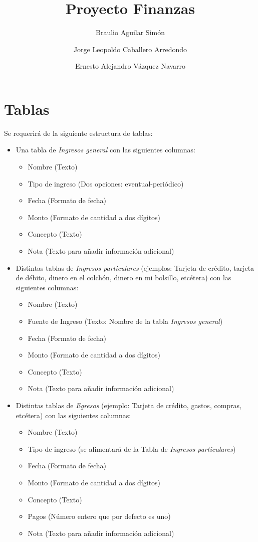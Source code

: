\documentclass[12pt]{article}
\title{Proyecto \textbf{Finanzas}}
\author{Braulio Aguilar Simón \and Jorge Leopoldo Caballero Arredondo \and Ernesto Alejandro Vázquez Navarro}
\theoremstyle{definition}
\begin{document}
\maketitle


\section{Tablas}

Se requerirá de la siguiente estructura de tablas:
\begin{itemize}
\item Una tabla de \textit{Ingresos general} con las siguientes columnas:
\begin{itemize}
\item Nombre (Texto)
\item Tipo de ingreso (Dos opciones: eventual-periódico)
\item Fecha (Formato de fecha)
\item Monto (Formato de cantidad a dos dígitos)
\item Concepto (Texto)
\item Nota (Texto para añadir información adicional)
\end{itemize}

\item Distintas tablas de \textit{Ingresos particulares} (ejemplos: Tarjeta de crédito, tarjeta de débito, dinero en el colchón, dinero en mi bolsillo, etcétera) con las siguientes columnas:
\begin{itemize}
\item Nombre (Texto)
\item Fuente de Ingreso (Texto: Nombre de la tabla \textit{Ingresos general})
\item Fecha (Formato de fecha)
\item Monto (Formato de cantidad a dos dígitos)
\item Concepto (Texto)
\item Nota (Texto para añadir información adicional)
\end{itemize}

\item Distintas tablas de \textit{Egresos} (ejemplo: Tarjeta de crédito, gastos, compras, etcétera) con las siguientes columnas:
\begin{itemize}
\item Nombre (Texto)
\item Tipo de ingreso (se alimentará de la Tabla de \textit{Ingresos particulares})
\item Fecha (Formato de fecha)
\item Monto (Formato de cantidad a dos dígitos)
\item Concepto (Texto)
\item Pagos (Número entero que por defecto es uno)
\item Nota (Texto para añadir información adicional)
\end{itemize}

\end{itemize}
\end{document}
